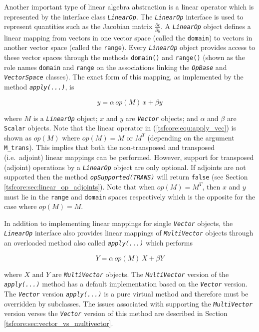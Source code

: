 Another important type of linear algebra abstraction is a linear
operator which is represented by the interface class
\texttt{\textit{LinearOp}}.  The \texttt{\textit{LinearOp}} interface
is used to represent quantities such as the Jacobian matrix
$\frac{\partial c}{\partial y}$. A \texttt{\textit{LinearOp}} object
defines a linear mapping from vectors in one vector space (called the
\texttt{domain}) to vectors in another vector space (called the
\texttt{range}).  Every \texttt{\textit{LinearOp}} object provides
access to these vector spaces through the methods \texttt{domain()} and
\texttt{range()} (shown as the role names \texttt{domain} and
\texttt{range} on the associations linking the
\texttt{\textit{OpBase}} and \texttt{\textit{VectorSpace}} classes).
The exact form of this mapping, as implemented by the
method \texttt{\textit{apply(\-...)}}, is

\begin{equation}
y = \alpha \, op(M) \, x + \beta y
\label{tsfcore:equ:apply_vec}
\end{equation}

where $M$ is a \texttt{\textit{LinearOp}} object; $x$ and $y$ are
\texttt{\textit{Vector}} objects; and $\alpha$ and $\beta$ are \texttt{Scalar}
objects.  Note that the linear operator in (\ref{tsfcore:equ:apply_vec})
is shown as $op(M)$ where $op(M) = M$ or $M^T$ (depending on the
argument \texttt{M\_trans}). This implies that both the non-transposed
and transposed (i.e.~adjoint) linear mappings can be performed.
However, support for transposed (adjoint) operations by a
\texttt{\textit{LinearOp}} object are only optional.  If adjoints are
not supported then the method \texttt{\textit{opSupported(TRANS)}}
will return \texttt{false} (see Section
\ref{tsfcore:sec:linear_op_adjoints}).  Note that when $op(M) = M^T$,
then $x$ and $y$ must lie in the \texttt{range} and
\texttt{domain} spaces respectively which is the opposite for the case
where $op(M) = M$.

In addition to implementing linear mappings for single
\texttt{\textit{Vector}} objects, the
\texttt{\textit{LinearOp}} interface also provides linear mappings of
\texttt{\textit{Multi\-Vector}} objects through an overloaded method
also called \texttt{\textit{apply(\-...)}} which performs

\begin{equation}
Y = \alpha \, op(M) \, X + \beta Y
\label{tsfcore:equ:apply_multi_vec}
\end{equation}

where $X$ and $Y$ are \texttt{\textit{Multi\-Vector}} objects.  The
\texttt{\textit{Multi\-Vector}} version of the \texttt{\textit{apply(\-...)}} method has a
default implementation based on the \texttt{\textit{Vector}} version.
The \texttt{\textit{Vector}} version
\texttt{\textit{apply(\-...)}}  is a pure virtual method and therefore must be
overridden by subclasses.  The issues associated with supporting the
\texttt{\textit{Multi\-Vector}} version verses the \texttt{\textit{Vector}}
version of this method are described in Section
\ref{tsfcore:sec:vector_vs_multivector}.

